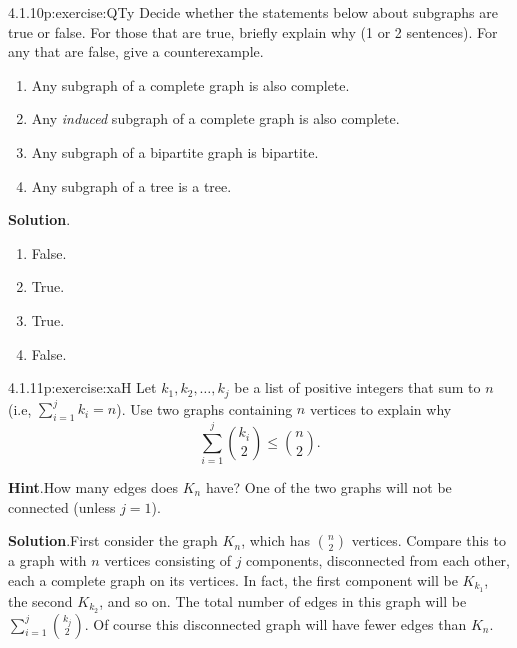 \documentclass[twoside,11pt,]{book}
\newcommand{\blocktitlefont}{\relax}
\numberwithin{equation}{chapter}
\begin{document}
\begin{divisionsolution}{4.1.10}{}{p:exercise:QTy}%
Decide whether the statements below about subgraphs are true or false.  For those that are true, briefly explain why (1 or 2 sentences).  For any that are false, give a counterexample.%
\begin{enumerate}[label=(\alph*)]
\item{}Any subgraph of a complete graph is also complete.%
\item{}Any \emph{induced} subgraph of a complete graph is also complete.%
\item{}Any subgraph of a bipartite graph is bipartite.%
\item{}Any subgraph of a tree is a tree.%
\end{enumerate}
%
\par\smallskip%
\noindent\textbf{\blocktitlefont Solution}.\quad{}%
\begin{multicols}{4}
\begin{enumerate}[label=(\alph*)]
\item{}False.%
\item{}True.%
\item{}True.%
\item{}False.%
\end{enumerate}
\end{multicols}
%
\end{divisionsolution}%
\begin{divisionsolution}{4.1.11}{}{p:exercise:xaH}%
Let \(k_1, k_2, \ldots,
k_j\) be a list of positive integers that sum to \(n\) (i.e, \(\sum_{i=1}^j k_i = n\)). Use two graphs containing \(n\) vertices to explain why%
\begin{equation*}
\sum_{i = 1}^j \binom{k_i}{2} \le \binom{n}{2}\text{.}
\end{equation*}
%
\par\smallskip%
\noindent\textbf{\blocktitlefont Hint}.\quad{}How many edges does \(K_n\) have?  One of the two graphs will not be connected (unless \(j=1\)).%
\par\smallskip%
\noindent\textbf{\blocktitlefont Solution}.\quad{}First consider the graph \(K_n\), which has \(\binom{n}{2}\) vertices. Compare this to a graph with \(n\) vertices consisting of \(j\) components, disconnected from each other, each a complete graph on its vertices. In fact, the first component will be \(K_{k_1}\), the second \(K_{k_2}\), and so on. The total number of edges in this graph will be \(\sum_{i=1}^j\binom{k_j}{2}\). Of course this disconnected graph will have fewer edges than \(K_n\).%
\end{divisionsolution}%
\end{document}
